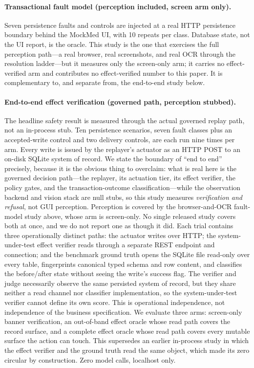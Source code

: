 \paragraph{Transactional fault model (perception included, screen arm only).}
Seven persistence faults and controls are injected at a real HTTP persistence
boundary behind the MockMed UI, with 10 repeats per class. Database state, not
the UI report, is the oracle. This study is the one that exercises the full
perception path---a real browser, real screenshots, and real OCR through the
resolution ladder---but it measures only the screen-only arm; it carries no
effect-verified arm and contributes no effect-verified number to this paper. It
is complementary to, and separate from, the end-to-end study below.

\paragraph{End-to-end effect verification (governed path, perception stubbed).}
The headline safety result is measured through the actual governed replay path,
not an in-process stub. Ten persistence scenarios, seven fault classes plus an
accepted-write control and two delivery controls, are each run nine times per
arm. Every write is issued by the replayer's actuator as an HTTP POST to an
on-disk SQLite system of record. We state the boundary of ``end to end''
precisely, because it is the obvious thing to overclaim: what is real here is
the governed decision path---the replayer, its actuation tier, its effect
verifier, the policy gates, and the transaction-outcome classification---while
the observation backend and vision stack are null stubs, so this study measures
\emph{verification and refusal}, not GUI perception. Perception is covered by
the browser-and-OCR fault-model study above, whose arm is screen-only. No single
released study covers both at once, and we do not report one as though it did.
Each trial contains three operationally
distinct paths: the actuator writes over HTTP; the system-under-test effect
verifier reads through a separate REST endpoint and connection; and the
benchmark ground truth opens the SQLite file read-only over every table,
fingerprints canonical typed schema and row content, and classifies the
before/after state without seeing the write's success flag. The verifier and
judge necessarily observe the same persisted system of record, but they share
neither a read channel nor classifier implementation, so the system-under-test
verifier cannot define its own score. This is operational independence, not
independence of the business specification. We evaluate three arms:
screen-only banner verification, an out-of-band effect oracle whose read path
covers the record surface, and a complete effect oracle whose read path covers
every mutable surface the action can touch. This supersedes an earlier in-process
study in which the effect verifier and the ground truth read the same object,
which made its zero circular by construction. Zero model calls, localhost only.

